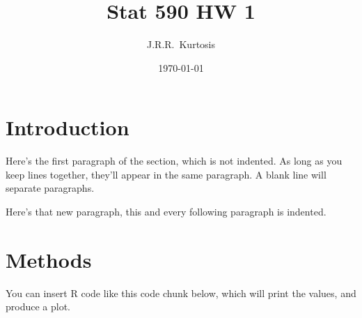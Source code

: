 \documentclass[letterpaper,12pt]{article}
\title{Stat 590 HW 1}
\author{J.R.R.~Kurtosis}
\date{\today}
\begin{document}


\begin{Schunk}
\end{Schunk}

\maketitle

\tableofcontents


\section{Introduction}
Here's the first paragraph of the section, which is not indented.
As long as you keep lines together, they'll appear in the same paragraph.
A blank line will separate paragraphs.

Here's that new paragraph, this and every following paragraph is indented.

\section{Methods}

You can insert R code like this code chunk below, which will print the values,
  and produce a plot.
\end{document}
